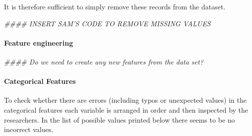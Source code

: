\documentclass[12pt]{article}
\newenvironment{Shaded}{\begin{snugshade}}{\end{snugshade}}
\newcommand{\CommentTok}[1]{\textcolor[rgb]{0.56,0.35,0.01}{\textit{#1}}}
\begin{document}
It is therefore sufficient to simply remove these records from the
dataset.

\begin{Shaded}
\begin{Highlighting}[]
\CommentTok{#### INSERT SAM'S CODE TO REMOVE MISSING VALUES}
\end{Highlighting}
\end{Shaded}

\hypertarget{feature-engineering}{%
\paragraph{Feature engineering}\label{feature-engineering}}

\begin{Shaded}
\begin{Highlighting}[]
\CommentTok{#### Do we need to create any new features from the data set?}
\end{Highlighting}
\end{Shaded}

\hypertarget{categorical-features}{%
\paragraph{Categorical Features}\label{categorical-features}}

To check whether there are errors (including typos or unexpected values)
in the categorical features each variable is arranged in order and then
inspected by the researchers. In the list of possible values printed
below there seems to be no incorrect values.
\end{document}
